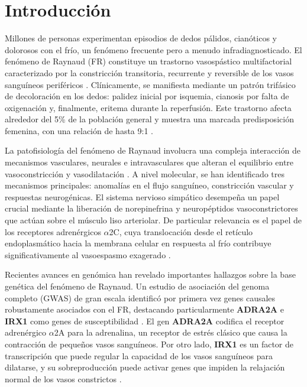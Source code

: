 \section{Introducción}

Millones de personas experimentan episodios de dedos pálidos, cianóticos y dolorosos con el frío, un fenómeno frecuente pero a menudo infradiagnosticado. El fenómeno de Raynaud (FR) constituye un trastorno vasospástico multifactorial caracterizado por la constricción transitoria, recurrente y reversible de los vasos sanguíneos periféricos \cite{Nawaz2022}.  Clínicamente, se manifiesta mediante un patrón trifásico de decoloración en los dedos: palidez inicial por isquemia, cianosis por falta de oxigenación y, finalmente, eritema durante la reperfusión. Este trastorno afecta alrededor del 5\% de la población general y muestra una marcada predisposición femenina, con una relación de hasta 9:1 \cite{Medscape2024, Musa2023}.

La patofisiología del fenómeno de Raynaud involucra una compleja interacción de mecanismos vasculares, neurales e intravasculares que alteran el equilibrio entre vasoconstricción y vasodilatación \cite{Herrick2005}. A nivel molecular, se han identificado tres mecanismos principales: anomalías en el flujo sanguíneo, constricción vascular y respuestas neurogénicas. El sistema nervioso simpático desempeña un papel crucial mediante la liberación de norepinefrina y neuropéptidos vasoconstrictores que actúan sobre el músculo liso arteriolar. De particular relevancia es el papel de los receptores adrenérgicos $\alpha$2C, cuya translocación desde el retículo endoplasmático hacia la membrana celular en respuesta al frío contribuye significativamente al vasoespasmo exagerado \cite{Fardoun2016, Flavahan2008}.

Recientes avances en genómica han revelado importantes hallazgos sobre la base genética del fenómeno de Raynaud. Un estudio de asociación del genoma completo (GWAS) de gran escala identificó por primera vez genes causales robustamente asociados con el FR, destacando particularmente \textbf{ADRA2A} e \textbf{IRX1} como genes de susceptibilidad \cite{Hartmann2023}. El gen \textbf{ADRA2A} codifica el receptor adrenérgico $\alpha$2A para la adrenalina, un receptor de estrés clásico que causa la contracción de pequeños vasos sanguíneos. Por otro lado, \textbf{IRX1} es un factor de transcripción que puede regular la capacidad de los vasos sanguíneos para dilatarse, y su sobreproducción puede activar genes que impiden la relajación normal de los vasos constrictos \cite{ofLondon2023}.


